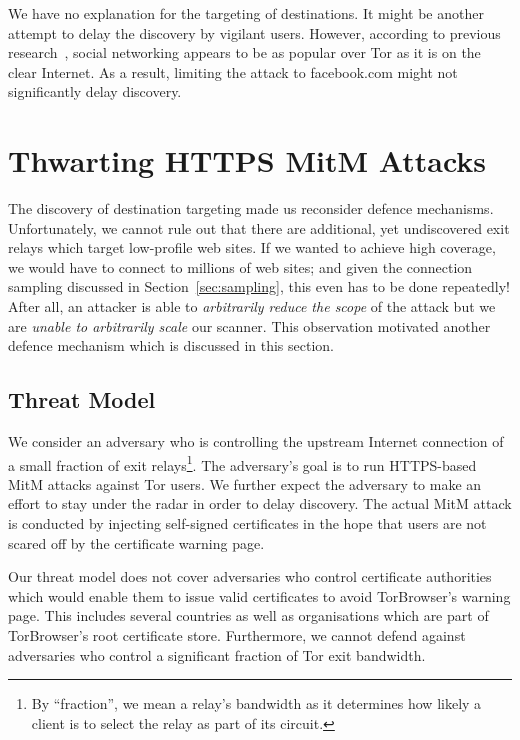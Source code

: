 \documentclass[letterpaper,twocolumn,10pt]{article}
\begin{document}
We have no explanation for the targeting of destinations.  It might be another attempt to delay the
discovery by vigilant users.  However, according to previous research~\cite{Huber2010}, social
networking appears to be as popular over Tor as it is on the clear Internet.  As a result, limiting
the attack to facebook.com might not significantly delay discovery.





\section{Thwarting HTTPS MitM Attacks}
\label{sec:thwarting}
The discovery of destination targeting made us reconsider defence mechanisms. Unfortunately, we
cannot rule out that there are additional, yet undiscovered exit relays which target low-profile web
sites.  If we wanted to achieve high coverage, we would have to connect to millions of web sites;
and given the connection sampling discussed in Section~\ref{sec:sampling}, this even has to be done
repeatedly!  After all, an attacker is able to \emph{arbitrarily reduce the scope} of the attack but
we are \emph{unable to arbitrarily scale} our scanner.  This observation motivated another defence
mechanism which is discussed in this section.

\subsection{Threat Model}
We consider an adversary who is controlling the upstream Internet connection of a small fraction of
exit relays\footnote{By ``fraction'', we mean a relay's bandwidth as it determines how likely a
client is to select the relay as part of its circuit.}. The adversary's goal is to run HTTPS-based
MitM attacks against Tor users.  We further expect the adversary to make an effort to stay under the
radar in order to delay discovery.  The actual MitM attack is conducted by injecting self-signed
certificates in the hope that users are not scared off by the certificate warning page.

Our threat model does not cover adversaries who control certificate authorities which would enable
them to issue valid certificates to avoid TorBrowser's warning page.  This includes several
countries as well as organisations which are part of TorBrowser's root certificate store.
Furthermore, we cannot defend against adversaries who control a significant fraction of Tor exit
bandwidth.
\end{document}
